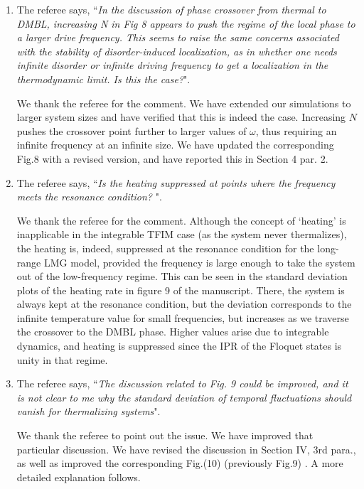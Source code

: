 \documentclass[aps,prb,reprint,showpacs,floatfix,superscriptaddress, onecolumn, nofootinbib, 9pt]{revtex4-2}
\newcommand{\response}[1]{{\color{black}#1}} %
\newcommand{\comment}[1]{{\color{blue}#1}} %
\begin{document}
\begin{enumerate}
		\item The referee says, \comment{``\textit{In the discussion of phase crossover from thermal to DMBL, increasing N in Fig 8 appears to push the regime of the local phase to a larger drive frequency. This seems to raise the same concerns associated with the stability of disorder-induced localization, as in whether one needs infinite disorder or infinite driving frequency to get a localization in the thermodynamic limit. Is this the case?}"}.
		
		\response{    	
			We thank the referee for the comment. We have extended our simulations to larger system sizes and have verified that this is indeed the case. Increasing $N$ pushes the crossover point further to larger values of $\omega$, thus requiring an infinite frequency at an infinite size. We have updated the corresponding Fig.8 with a revised version, and have reported this in Section 4 par. 2.
		}
		\item The referee says, \comment{``\textit{Is the heating suppressed at points where the frequency meets the resonance condition? }"}.
		
		\response{
			We thank the referee for the comment. Although the concept of `heating' is inapplicable in the integrable TFIM case (as the system never thermalizes), the heating is, indeed, suppressed at the resonance condition for the long-range LMG model, provided the frequency is large enough to take the system out of the low-frequency regime. This can be seen in the standard deviation plots of the heating rate in figure 9 of the manuscript. There, the system is always kept at the resonance condition, but the deviation corresponds to the infinite temperature value for small frequencies, but increases as we traverse the crossover to the DMBL phase. Higher values arise due to integrable dynamics, and heating is suppressed since the IPR of the Floquet states is unity in that regime.}
		
		\item The referee says, \comment{``\textit{The discussion related to Fig. 9 could be improved, and it is not clear to me why the standard deviation of temporal fluctuations should vanish for thermalizing systems}"}.\\
		
		\response{ We thank the referee to point out the issue. We have improved that particular discussion. We have revised the discussion in Section IV, 3rd para., as well as improved the corresponding Fig.(10) (previously Fig.9) \todo{check the Fig number}. A more detailed explanation follows.
			
}
\end{enumerate}
\end{document}
